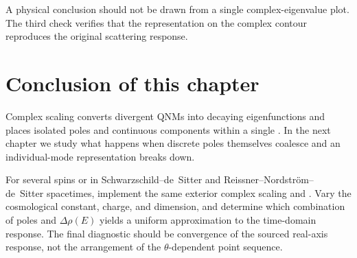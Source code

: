 A physical conclusion should not be drawn from a single complex-eigenvalue plot. The third check verifies that the representation on the complex contour reproduces the original scattering response.

\section{Conclusion of this chapter}

Complex scaling converts divergent QNMs into decaying eigenfunctions and places isolated poles and continuous components within a single . In the next chapter we study what happens when discrete poles themselves coalesce and an individual-mode representation breaks down.

\begin{researchproblem}
For several spins or  in Schwarzschild--de~Sitter and Reissner--Nordstr\"om--de~Sitter spacetimes, implement the same exterior complex scaling and . Vary the cosmological constant, charge, and dimension, and determine which combination of poles and $\Delta\rho(E)$ yields a uniform approximation to the time-domain response. The final diagnostic should be convergence of the sourced real-axis response, not the arrangement of the $\theta$-dependent point sequence.
\end{researchproblem}

